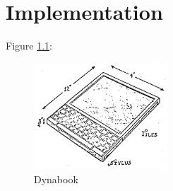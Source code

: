 \chapter{Implementation}


\lipsum

Figure \ref{fig:dynabook}:

\begin{figure}[h]
\begin{centering}
\includegraphics[width=5cm]{assets/images/Dynabook}
\par\end{centering}
\caption{Dynabook \label{fig:dynabook}}
\end{figure}